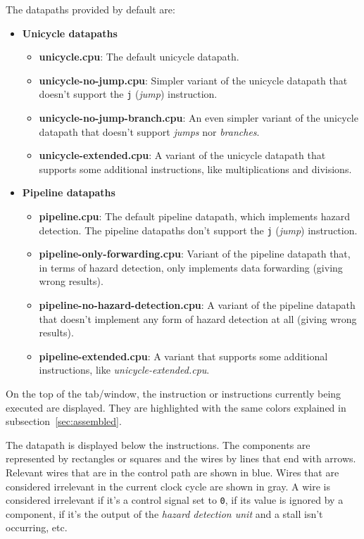 \documentclass[11pt,a4paper,twoside,titlepage]{article}
\begin{document}
The datapaths provided by default are:
\begin{itemize}
	\item \textbf{Unicycle datapaths}
	\begin{itemize}
		\item \textbf{unicycle.cpu}: The default unicycle datapath.
		\item \textbf{unicycle-no-jump.cpu}: Simpler variant of the unicycle 
			datapath that doesn't support the \verb+j+ (\emph{jump}) 
			instruction.
		\item \textbf{unicycle-no-jump-branch.cpu}: An even simpler variant 
			of the unicycle datapath that doesn't support \emph{jumps} nor
			\emph{branches}.
		\item \textbf{unicycle-extended.cpu}: A variant of the unicycle 
			datapath that supports some additional instructions, like 
			multiplications and divisions.
	\end{itemize}
	
	\item \textbf{Pipeline datapaths}
	\begin{itemize}
		\item \textbf{pipeline.cpu}: The default pipeline datapath, which
			implements hazard detection. The pipeline datapaths don't
			support the \verb+j+ (\emph{jump}) instruction.
		\item \textbf{pipeline-only-forwarding.cpu}: Variant of the pipeline
			datapath that, in terms of hazard detection, only implements
			data forwarding (giving wrong results).
		\item \textbf{pipeline-no-hazard-detection.cpu}: A variant of the
			pipeline datapath that doesn't implement any form of hazard 
			detection at all (giving wrong results).
		\item \textbf{pipeline-extended.cpu}: A variant that supports some
			additional instructions, like \emph{unicycle-extended.cpu}.
	\end{itemize}
\end{itemize}

On the top of the tab/window, the instruction or instructions currently 
being executed are displayed. They are highlighted with the same colors
explained in subsection~\ref{sec:assembled}.

The datapath is displayed below the instructions.
The components are represented by rectangles or squares and the wires by
lines that end with arrows.
Relevant wires that are in the control path are shown in blue.
Wires that are considered irrelevant in the current clock cycle are shown
in gray.
A wire is considered irrelevant if it's a control signal set to \verb+0+,
if its value is ignored by a component, if it's the output of the
\emph{hazard detection unit} and a stall isn't occurring, etc.
\end{document}
